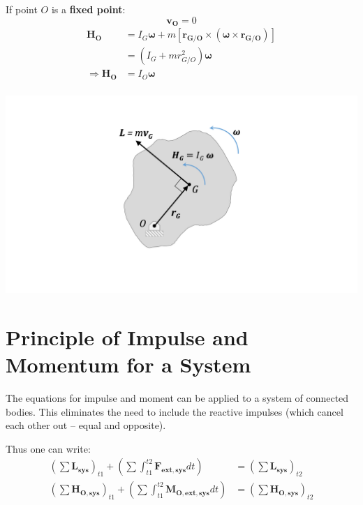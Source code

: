 \documentclass[12pt,letterpaper,twoside]{report}
\begin{document}
\begin{minipage}{0.6\textwidth}
If point $O$ is a \textbf{fixed point}: 
\[\bm{v_O} = 0\]
\begin{align*}
\bm{H_O} &= I_G \bm{\omega} + m \left[ \bm{r_{G/O}} \times \left( \bm{\omega} \times \bm{r_{G/O}} \right) \right]\\
&= \left( I_G + m r_{G/O}^2 \right) \bm{\omega}\\
\Rightarrow \bm{H_O} &= I_O \bm{\omega}\\
\end{align*}
\end{minipage}%
\begin{minipage}{0.5\textwidth}
\includegraphics[trim={8cm 3cm 7cm 1cm},clip,width=1\textwidth, left]{Slide100}
\end{minipage}

\newpage

\section{Principle of Impulse and Momentum for a System}
The equations for impulse and moment can be applied to a system of connected bodies.  This eliminates the need to include the reactive impulses (which cancel each other out – equal and opposite).

Thus one can write:
\begin{align*}
\left(\sum \bm{L_{sys}} \right)_{t1} + \left( \sum \int_{t1}^{t2} \bm{F_{ext,sys}} dt \right) &= \left(\sum \bm{L_{sys}} \right)_{t2} \\
\left(\sum \bm{H_{O,sys}} \right)_{t1} + \left( \sum \int_{t1}^{t2} \bm{M_{O,ext,sys}} dt \right) &= \left(\sum \bm{H_{O,sys}} \right)_{t2} \\
\end{align*}
\end{document}
